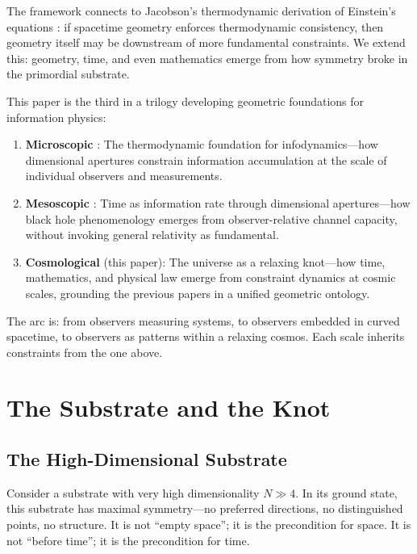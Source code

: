 \documentclass[11pt,a4paper]{article}
\begin{document}
The framework connects to Jacobson's thermodynamic derivation of Einstein's equations \cite{jacobson1995}: if spacetime geometry enforces thermodynamic consistency, then geometry itself may be downstream of more fundamental constraints. We extend this: geometry, time, and even mathematics emerge from how symmetry broke in the primordial substrate.

This paper is the third in a trilogy developing geometric foundations for information physics:

\begin{enumerate}
    \item \textbf{Microscopic} \cite{todd2025infodynamics}: The thermodynamic foundation for infodynamics---how dimensional apertures constrain information accumulation at the scale of individual observers and measurements.

    \item \textbf{Mesoscopic} \cite{todd2025aperture}: Time as information rate through dimensional apertures---how black hole phenomenology emerges from observer-relative channel capacity, without invoking general relativity as fundamental.

    \item \textbf{Cosmological} (this paper): The universe as a relaxing knot---how time, mathematics, and physical law emerge from constraint dynamics at cosmic scales, grounding the previous papers in a unified geometric ontology.
\end{enumerate}

The arc is: from observers measuring systems, to observers embedded in curved spacetime, to observers as patterns within a relaxing cosmos. Each scale inherits constraints from the one above.

\section{The Substrate and the Knot}

\subsection{The High-Dimensional Substrate}

Consider a substrate with very high dimensionality $N \gg 4$. In its ground state, this substrate has maximal symmetry---no preferred directions, no distinguished points, no structure. It is not ``empty space''; it is the precondition for space. It is not ``before time''; it is the precondition for time.
\end{document}
